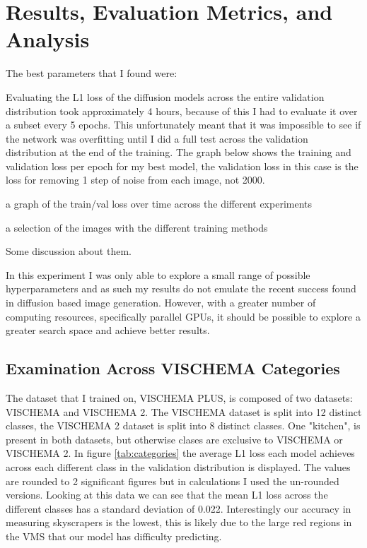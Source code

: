 \documentclass{UoYCSproject}
\begin{document}
\section{Results, Evaluation Metrics, and Analysis}

The best parameters that I found were: 

Evaluating the L1 loss of the diffusion models across the entire validation distribution took approximately 4 hours, because of this I had to evaluate it over a subset every 5 epochs. This unfortunately meant that it was impossible to see if the network was overfitting until I did a full test across the validation distribution at the end of the training. The graph below shows the training and validation loss per epoch for my best model, the validation loss in this case is the loss for removing 1 step of noise from each image, not 2000.

a graph of the train/val loss over time across the different experiments



a selection of the images with the different training methods


Some discussion about them.

In this experiment I was only able to explore a small range of possible hyperparameters and as such my results do not emulate the recent success found in diffusion based image generation. \cite{ramesh2022hierarchical, saharia2022photorealistic} However, with a greater number of computing resources, specifically parallel GPUs, it should be possible to explore a greater search space and achieve better results.

\subsection{Examination Across VISCHEMA Categories}

The dataset that I trained on, VISCHEMA PLUS, is composed of two datasets: VISCHEMA and VISCHEMA 2. The VISCHEMA dataset is split into 12 distinct classes, the VISCHEMA 2 dataset is split into 8 distinct classes. One "kitchen", is present in both datasets, but otherwise clases are exclusive to VISCHEMA or VISCHEMA 2. In figure \ref{tab:categories} the average L1 loss each model achieves across each different class in the validation distribution is displayed. The values are rounded to 2 significant figures but in calculations I used the un-rounded versions. Looking at this data we can see that the mean L1 loss across the different classes has a standard deviation of 0.022. Interestingly our accuracy in measuring skyscrapers is the lowest, this is likely due to the large red regions in the VMS that our model has difficulty predicting.
\end{document}
